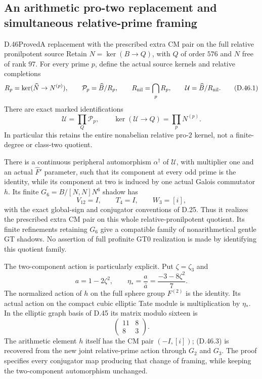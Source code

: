 \subsection{An arithmetic pro-two replacement and simultaneous relative-prime framing}

\begin{statement}{D.46}{Proved}{A replacement with the prescribed extra CM pair on the full relative pronilpotent source}
Retain \(N=\ker(B\to Q)\), with \(Q\) of order \(576\)
and \(N\) free of rank \(97\). For every prime \(p\), define
the actual source kernels and relative completions
\[
 R_p=\ker(\widehat N\to N^{(p)}),\qquad
 \mathcal P_p=\widehat B/R_p,\qquad
 R_{\rm nil}=\bigcap_pR_p,\qquad
 \mathcal U=\widehat B/R_{\rm nil}.
                                                               \tag{D.46.1}
\]
There are exact marked identifications
\[
 \mathcal U=\prod_Q\mathcal P_p,\qquad
 \ker(\mathcal U\to Q)=\prod_pN^{(p)}.                          \tag{D.46.2}
\]
In particular this retains the entire nonabelian relative
pro-\(2\) kernel, not a finite-degree or class-two quotient.

There is a continuous peripheral automorphism \(\alpha^\dagger\)
of \(\mathcal U\), with multiplier one and an actual
\(\widehat F'\) parameter, such that its component at every
odd prime is the identity, while its component at two
is induced by one actual Galois commutator \(h\).
Its finite \(G_6=B/[N,N]N^6\) shadow has
\[
                 V_{12}=I,\qquad T_4=I,\qquad W_3=[i],
                                                               \tag{D.46.3}
\]
with the exact global-sign and conjugator conventions of D.25.
Thus it realizes the prescribed extra CM pair on this whole
relative-pronilpotent quotient. Its finite refinements retaining
\(G_6\) give a compatible family of nonarithmetical gentle
GT shadows. No assertion of full profinite GT0 realization
is made by identifying this quotient family.

The two-component action is particularly explicit.
Put \(\zeta=\zeta_3\) and
\[
 a=1-2\zeta^2,\qquad
 \eta_*=\frac a{\bar a}=\frac{-3-8\zeta^2}{7}.
                                                               \tag{D.46.4}
\]
The normalized action of \(h\) on the full sphere group
\(F^{(2)}\) is the identity. Its actual action on the compact
cubic elliptic Tate module is multiplication by \(\eta_*\).
In the elliptic graph basis of D.45 its matrix modulo
sixteen is
\[
                  \begin{pmatrix}11&8\\8&3\end{pmatrix}.       \tag{D.46.5}
\]
The arithmetic element \(h\) itself has the CM pair
\((-I,[i])\); (D.46.3) is recovered from the new joint
relative-prime action through \(G_2\) and \(G_3\).
The proof specifies every conjugator map producing that
change of framing, while keeping the two-component
automorphism unchanged.


\end{statement}
